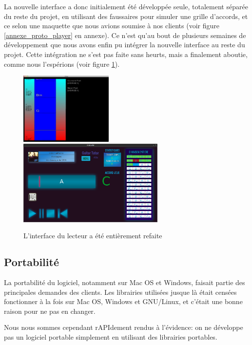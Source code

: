 La nouvelle interface a donc initialement été développée seule, totalement séparée du reste du projet, en utilisant des faussaires pour simuler une grille d'accords, et ce selon une maquette que nous avions soumise à nos clients (voir figure \ref{annexe_proto_player} en annexe). Ce n'est qu'au bout de plusieurs semaines de développement que nous avons enfin pu intégrer la nouvelle interface au reste du projet. Cette intégration ne s'est pas faite sans heurts, mais a finalement aboutie, comme nous l'espérions (voir figure \ref{interface_player}).

\begin{figure}[H]
\begin{center}
\includegraphics[width=175px]{ancien_player.png}
\includegraphics[width=275px]{interface_player.png}
\caption{L'interface du lecteur a été entièrement refaite}
\label{interface_player}
\end{center}
\end{figure}

\subsection{Portabilité}

La portabilité du logiciel, notamment sur Mac OS et Windows, faisait partie des principales demandes des clients. Les librairies utilisées jusque là était censées fonctionner à la fois sur Mac OS, Windows et GNU/Linux, et c'était une bonne raison pour ne pas en changer.

Nous nous sommes cependant r\ac{API}dement rendus à l'évidence: on ne développe pas un logiciel portable simplement en utilisant des librairies portables.

